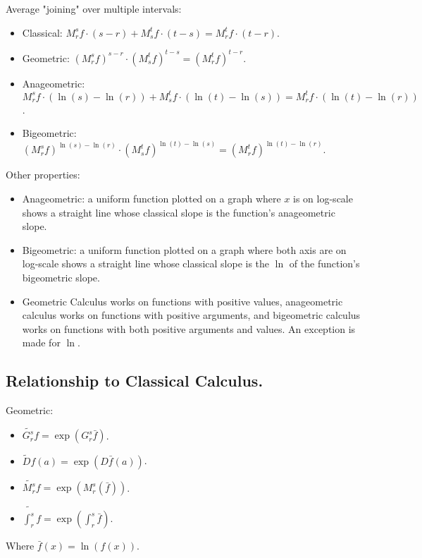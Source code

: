 Average "joining" over multiple intervals:

\begin{itemize}
	\item Classical: $M_r^s f \cdot (s - r) + M_s^t f \cdot (t - s) = M_r^t f \cdot (t - r)$.
	\item Geometric: $(M_r^s f)^{s - r} \cdot (M_s^t f)^{t - s} = (M_r^t f)^{t - r}$.
	\item Anageometric: $M_r^s f \cdot (\ln(s) - \ln(r)) + M_s^t f \cdot (\ln(t) - \ln(s)) = M_r^t f \cdot (\ln(t) - \ln(r))$.
	\item Bigeometric: $(M_r^s f)^{\ln(s) - \ln(r)} \cdot (M_s^t f)^{\ln(t) - \ln(s)} = (M_r^t f)^{\ln(t) - \ln(r)}$.
\end{itemize}

Other properties:

\begin{itemize}
	\item Anageometric: a uniform function plotted on a graph where $x$ is on log-scale shows a straight line whose classical slope is the function's anageometric slope.
	\item Bigeometric: a uniform function plotted on a graph where both axis are on log-scale shows a straight line whose classical slope is the $\ln$ of the function's bigeometric slope. 
	\item Geometric Calculus works on functions with positive values, anageometric calculus works on functions with positive arguments, and bigeometric calculus works on functions with both positive arguments and values. An exception is made for $\ln$.
\end{itemize}

\subsection{Relationship to Classical Calculus.}

Geometric:

\begin{itemize}
	\item $\tilde{G_r^s}f = \exp(G_r^s \bar{f})$.
	\item $\tilde{D}f(a) = \exp(D\bar{f}(a))$.
	\item $\tilde{M_r^s}f = \exp(M_r^s(\bar{f}))$.
	\item $\tilde{\int_r^s} f = \exp(\int_r^s \bar{f})$.
\end{itemize}

Where $\bar{f}(x) = \ln(f(x))$.

